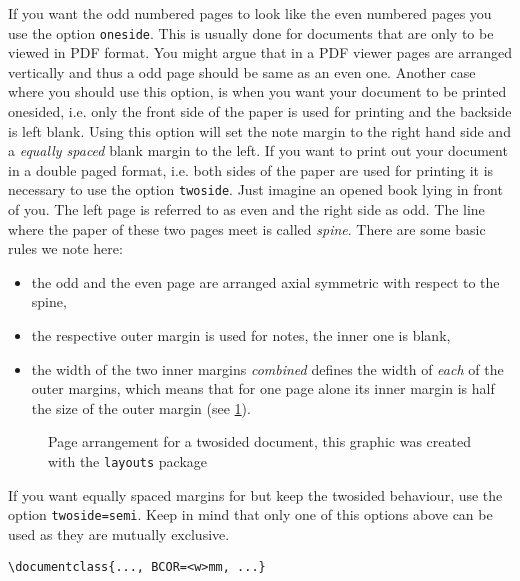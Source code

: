 If you want the odd numbered pages to look like the even numbered pages you use the option 
\lstinline[language={[LaTeX]TeX}]|oneside|. This is usually done for documents that are only 
to be viewed in PDF format. You might argue that in a PDF viewer pages are arranged 
vertically  and thus a odd page should be same as an even one. Another case where you 
should use this option, is when you want your document to be printed onesided, i.e. only 
the front side of the paper is used for printing and the backside is left blank. Using 
this option will set the note margin to the right hand side and a \emph{equally spaced} blank 
margin to the left. If you want to print out your
document in a double paged format, i.e. both sides of the paper are used for printing it is
necessary to use the option \lstinline[language={[LaTeX]TeX}]|twoside|. Just imagine an 
opened book lying in front of you. The left page is referred to as even and the right side 
as odd. The line where the paper of these two pages meet is called \emph{spine}. 
There are some basic rules we note here:
\begin{itemize}
\item the odd and the even page are arranged axial symmetric with respect to the spine,
\item the respective outer margin is used for notes, the inner one is blank, 
\item the width of the two inner margins \emph{combined} defines the width of \emph{each} 
of the outer margins, which means that for one page alone its inner margin is half the 
size of the outer margin (see \cref{fig:twosided}).
\end{itemize}
\begin{figure}
\newlength{\pwlay}
\setlength{\pwlay}{0.4375\textwidth}
\caption[Twosided margin spacing]{Page arrangement for a twosided document, this graphic was created with the 
		\texttt{layouts} package} \label{fig:twosided}
\end{figure}
If you want equally spaced margins for but keep the twosided behaviour, use the option
\lstinline[language={[LaTeX]TeX}]|twoside=semi|. Keep in mind that only one of this options 
above can be used as they are mutually exclusive.
\begin{emphBox}
\lstinline[language={[LaTeX]TeX}]|\documentclass{..., BCOR=<w>mm, ...}|
\end{emphBox}

